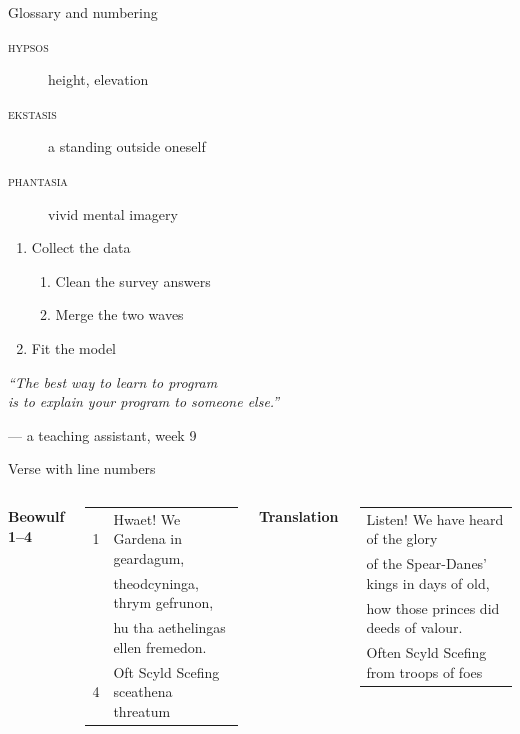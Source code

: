 \documentclass[aspectratio=169]{beamer}
\begin{document}
\begin{frame}{Glossary and numbering}
\begin{description}
\item[\textsc{hypsos}] height, elevation
\item[\textsc{ekstasis}] a standing outside oneself
\item[\textsc{phantasia}] vivid mental imagery
\end{description}
\begin{enumerate}
\item Collect the data
\begin{enumerate}
\item[2.1] Clean the survey answers
\item[2.2] Merge the two waves
\end{enumerate}
\item Fit the model
\end{enumerate}
\end{frame}

\begin{frame}{}
\vfill
\begin{center}
{\Large\itshape ``The best way to learn to program\\ is to explain your program to someone else.''}
\end{center}
\vspace{2mm}
\begin{flushright}
--- a teaching assistant, week 9\hspace*{1.5cm}
\end{flushright}
\vfill
\end{frame}

\begin{frame}{Verse with line numbers}
\begin{columns}[T]
\textbf{Beowulf 1--4}\par\smallskip
\begin{tabular}{@{}r@{\quad}l@{}}
1 & Hwaet! We Gardena in geardagum,\\
  & theodcyninga, thrym gefrunon,\\
  & hu tha aethelingas ellen fremedon.\\
4 & Oft Scyld Scefing sceathena threatum\\
\end{tabular}
\textbf{Translation}\par\smallskip
\begin{tabular}{@{}l@{}}
Listen! We have heard of the glory\\
of the Spear-Danes' kings in days of old,\\
how those princes did deeds of valour.\\
Often Scyld Scefing from troops of foes\\
\end{tabular}
\end{columns}
\end{frame}
\end{document}
